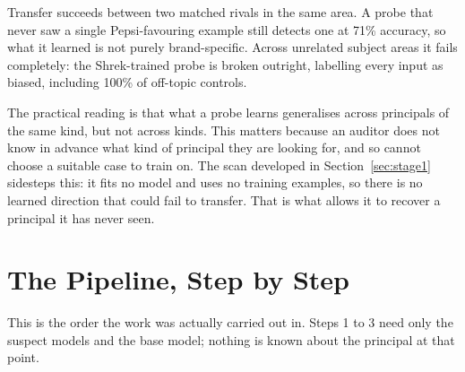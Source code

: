 \documentclass[11pt, a4paper]{article}
\begin{document}
\vspace{0.5em}

Transfer succeeds between two matched rivals in the same area. A probe that
never saw a single Pepsi-favouring example still detects one at 71\%
accuracy, so what it learned is not purely brand-specific. Across unrelated
subject areas it fails completely: the Shrek-trained probe is broken outright,
labelling every input as biased, including 100\% of off-topic controls.

The practical reading is that what a probe learns generalises across
principals of the same kind, but not across kinds. This matters because an
auditor does not know in advance what kind of principal they are looking for,
and so cannot choose a suitable case to train on. The scan developed in
Section~\ref{sec:stage1} sidesteps this: it fits no model and uses no
training examples, so there is no learned direction that could fail to
transfer. That is what allows it to recover a principal it has never seen.

\section{The Pipeline, Step by Step}

This is the order the work was actually carried out in. Steps 1 to 3 need only
the suspect models and the base model; nothing is known about the principal at
that point.
\end{document}
